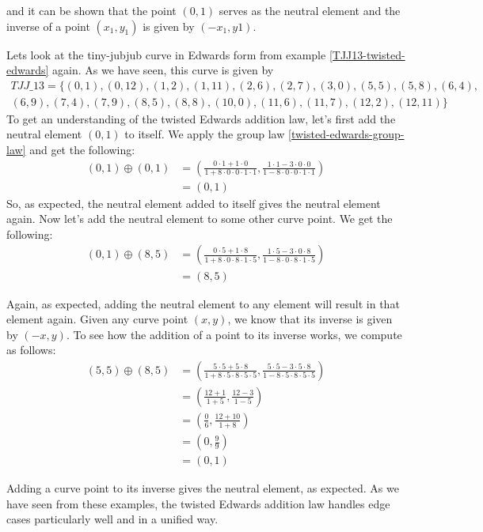 and it can be shown that the point $(0,1)$ serves as the neutral element and the inverse of a point $(x_1, y_1)$ is given by $(-x_1, y1)$.
\begin{example} Lets look at the tiny-jubjub curve in Edwards form from example \ref{TJJ13-twisted-edwards} again. As we have seen, this curve is given by
\begin{multline*}
\mathit{TJJ\_13} = \{(0, 1),(0, 12),(1, 2),(1, 11),(2, 6),(2, 7),(3, 0),(5, 5),(5, 8),(6, 4),\\
(6, 9),(7, 4),(7, 9),(8, 5),(8, 8),(10, 0),(11, 6),(11, 7),(12, 2),(12, 11)\}
\end{multline*}
To get an understanding of the twisted Edwards addition law, let's first add the neutral element $(0,1)$ to itself. We apply the group law \ref{twisted-edwards-group-law} and get the following:
\begin{align*}
(0, 1) \oplus (0, 1) &= \left(\frac{0\cdot 1+1 \cdot 0}{1 +8\cdot0\cdot 0\cdot 1\cdot 1},\frac{1\cdot 1-3\cdot 0\cdot 0}{1-8\cdot 0\cdot 0\cdot 1\cdot 1}\right)\\
                     & = (0,1)
\end{align*}
So, as expected, the neutral element added to itself gives the neutral element again. Now let's add the neutral element to some other curve point. We get the following:
\begin{align*}
(0, 1) \oplus (8, 5) &= \left(\frac{0\cdot 5+1 \cdot 8}{1 +8\cdot0\cdot 8\cdot 1\cdot 5},\frac{1\cdot 5 - 3\cdot 0\cdot 8}{1-8\cdot 0\cdot 8\cdot 1\cdot 5}\right)\\
                     & = (8,5)
\end{align*}

Again, as expected, adding the neutral element to any element will result in that element again. Given any curve point $(x,y)$, we know that its inverse is given by $(-x,y)$. To see how the addition of a point to its inverse works, we compute as follows:
\begin{align*}
(5, 5) \oplus (8, 5) &= \left(\frac{5\cdot 5+5 \cdot 8}{1 +8\cdot 5\cdot 8\cdot 5\cdot 5},\frac{5\cdot 5 - 3\cdot 5\cdot 8}{1-8\cdot 5\cdot 8\cdot 5\cdot 5}\right)\\
                     &= \left(\frac{12+1}{1 +5},\frac{12 - 3}{1-5}\right)\\
                     &= \left(\frac{0}{6},\frac{12 + 10}{1+8}\right)\\
                     &= \left(0,\frac{9}{9}\right)\\
                     &=  (0,1)
\end{align*}

Adding a curve point to its inverse gives the neutral element, as expected. As we have seen from these examples, the twisted Edwards addition law handles edge cases particularly well and in a unified way.
\end{example}

